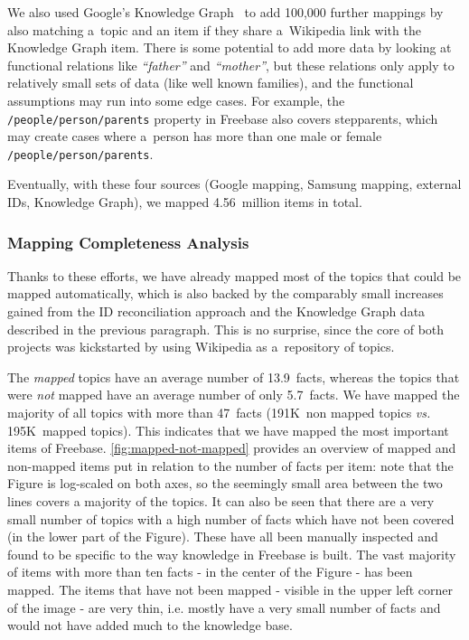 \documentclass{acm_proc_article-sp}
\begin{document}
We also used Google's Knowledge Graph~\cite{singhal2012} to add 100,000 further mappings
by also matching a~topic and an item if they share a~Wikipedia link with the Knowledge Graph item.
There is some potential to add more data by looking at functional relations
like \textit{``father''} and \textit{``mother''},
but these relations only apply to relatively small sets of data
(like well known families), and the functional assumptions may run into some edge cases.
For example, the \texttt{/people/person/parents} property in Freebase also covers stepparents,
which may create cases where a~person has more than one male or female \texttt{/people/person/parents}.

Eventually, with these four sources (Google mapping, Samsung mapping, external IDs, Knowledge Graph),
we mapped 4.56~million items in total.

\subsubsection{Mapping Completeness Analysis}

Thanks to these efforts, we have already mapped most of the topics that could be mapped automatically,
which is also backed by the comparably small increases gained from the ID reconciliation approach 
and the Knowledge Graph data described in the previous paragraph.
This is no surprise, since the core of both projects was kickstarted by using
Wikipedia as a~repository of topics.

The \emph{mapped} topics have an average number of 13.9~facts,
whereas the topics that were \emph{not} mapped have an average number of only 5.7~facts.
We have mapped the majority of all topics with more than 47~facts
(191K~non mapped topics \textit{vs.} 195K~mapped topics).
This indicates that we have mapped the most important items of Freebase.
\autoref{fig:mapped-not-mapped} provides an overview of mapped and non-mapped items
put in relation to the number of facts per item: note that the Figure is log-scaled
on both axes, so the seemingly small area between the two lines covers a majority of
the topics. It can also be seen that there are a very small number of topics with
a high number of facts which have not been covered (in the lower part of the Figure).
These have all been manually inspected and found to be specific to the way knowledge
in Freebase is built. The vast majority of items with more than ten facts - in the
center of the Figure - has been mapped. The items that have not been mapped -
visible in the upper left corner of the image - are very thin,
i.e. mostly have a very small number of facts and
would not have added much to the knowledge base.
\end{document}

